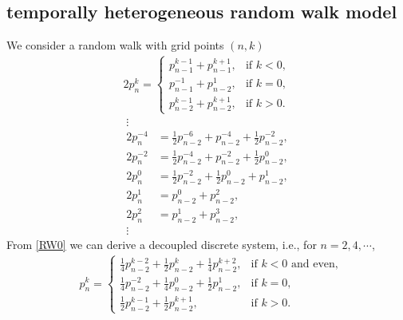 \documentclass[a4paper,11pt]{article}
\def\blue{\color{blue}}
\theoremstyle{remark}
\begin{document}
\subsection{temporally heterogeneous random walk model}
We consider a random walk with grid points $(n,k)$
\begin{equation} \label{RW0}\tag{RW0}
\begin{aligned}
    2p^k_n = \left\{\begin{array}{lr}
        p^{k-1} _{n-1} + p ^{k+1} _{n-1}, & \text{if } k<0,\\
        p^{-1} _{n-1} + p ^{1} _{n-2}, & \text{if } k=0,\\
        p^{k-1} _{n-2} + p ^{k+1} _{n-2}, & \text{if } k>0.
        \end{array}\right.
\end{aligned}
\end{equation}
{\blue
\begin{equation*} %
\begin{aligned}
    \vdots &\\
    2p^{-4}_n &= \frac{1}{2}p^{-6} _{n-2} + p ^{-4} _{n-2} + \frac{1}{2} p^{-2}_{n-2},\\
    2p^{-2}_n &= \frac{1}{2}p^{-4} _{n-2} + p ^{-2} _{n-2} + \frac{1}{2} p^0_{n-2},\\
    2p^0_n &= \frac{1}{2}p^{-2} _{n-2} + \frac{1}{2}p^{0} _{n-2} + p ^{1} _{n-2},\\
    2p^1_n &= p^{0} _{n-2} + p ^{2} _{n-2},\\
    2p^2_n &= p^{1} _{n-2} + p ^{3} _{n-2},\\
    \vdots &
\end{aligned}
\end{equation*}
}
From \eqref{RW0} we can derive a decoupled discrete system, i.e., for $n=2,4,\cdots$,
\begin{equation} \label{RW1}\tag{RW1}
\begin{aligned}
    &p^{k}_n = \left\{\begin{array}{ll}
        \frac{1}{4}p^{k-2} _{n-2} + \frac{1}{2}p ^{k} _{n-2} + \frac{1}{4} p^{k+2}_{n-2}, & \text{if $k<0$ and even},\\
        \frac{1}{4}p^{-2} _{n-2} + \frac{1}{4}p^{0} _{n-2} + \frac{1}{2}p ^{1} _{n-2}, & \text{if $k=0$},\\
        \frac{1}{2}p^{k-1} _{n-2} + \frac{1}{2}p ^{k+1} _{n-2}, & \text{if } k>0.
        \end{array}\right. 
\end{aligned}
\end{equation}
\end{document}
